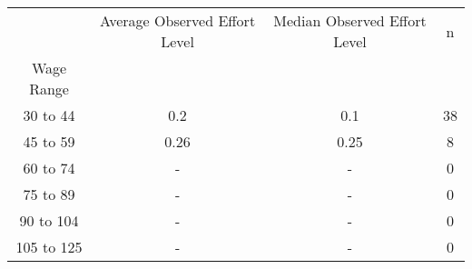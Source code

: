 \begin{tabular}{cccc}
\toprule
{} & Average Observed Effort Level & Median Observed Effort Level &   n \\
Wage Range &                               &                              &     \\
\midrule
30 to 44   &                           0.2 &                          0.1 &  38 \\
45 to 59   &                          0.26 &                         0.25 &   8 \\
60 to 74   &                             - &                            - &   0 \\
75 to 89   &                             - &                            - &   0 \\
90 to 104  &                             - &                            - &   0 \\
105 to 125 &                             - &                            - &   0 \\
\bottomrule
\end{tabular}
